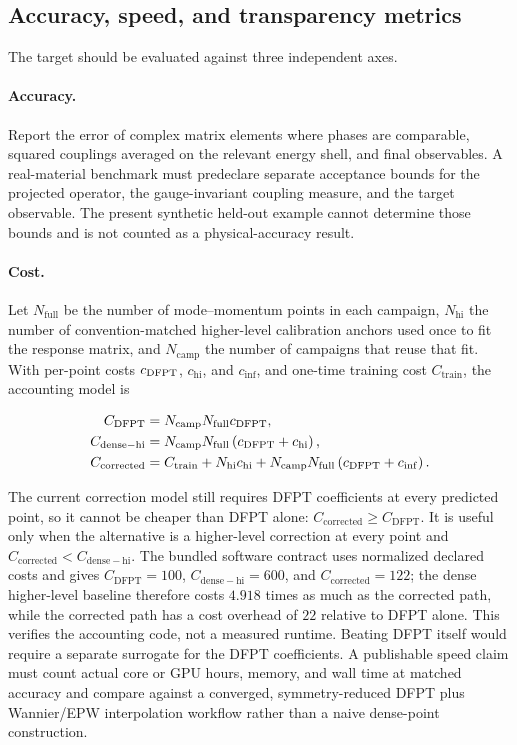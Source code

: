 \subsection{Accuracy, speed, and transparency metrics}

The target should be evaluated against three independent axes.

\paragraph{Accuracy.}
Report the error of complex matrix elements where phases are comparable, squared
couplings averaged on the relevant energy shell, and final observables.  A
real-material benchmark must predeclare separate acceptance bounds for the
projected operator, the gauge-invariant coupling measure, and the target
observable.  The present synthetic held-out example cannot determine those
bounds and is not counted as a physical-accuracy result.

\paragraph{Cost.}
Let $N_{\mathrm{full}}$ be the number of mode--momentum points in each
campaign, $N_{\mathrm{hi}}$ the number of convention-matched higher-level
calibration anchors used once to fit the response matrix, and
$N_{\mathrm{camp}}$ the number of campaigns that reuse that fit.  With
per-point costs $c_{\mathrm{DFPT}}$, $c_{\mathrm{hi}}$, and $c_{\mathrm{inf}}$, and
one-time training cost $C_{\mathrm{train}}$, the accounting model is

\begin{align}
 C_{\mathrm{DFPT}}
 &=N_{\mathrm{camp}}N_{\mathrm{full}}c_{\mathrm{DFPT}},\\
 C_{\mathrm{dense-hi}}
 &=N_{\mathrm{camp}}N_{\mathrm{full}}
   \left(c_{\mathrm{DFPT}}+c_{\mathrm{hi}}\right),\\
 C_{\mathrm{corrected}}
 &=C_{\mathrm{train}}
 +N_{\mathrm{hi}}c_{\mathrm{hi}}
 +N_{\mathrm{camp}}N_{\mathrm{full}}
   \left(c_{\mathrm{DFPT}}+c_{\mathrm{inf}}\right).
 \label{eq:costmodel}
\end{align}

The current correction model still requires DFPT coefficients at every predicted
point, so it cannot be cheaper than DFPT alone:
$C_{\mathrm{corrected}}\ge C_{\mathrm{DFPT}}$.  It is useful only when the
alternative is a higher-level correction at every point and
$C_{\mathrm{corrected}}<C_{\mathrm{dense-hi}}$.  The bundled software contract
uses normalized declared costs and gives $C_{\mathrm{DFPT}}=100$,
$C_{\mathrm{dense-hi}}=600$, and $C_{\mathrm{corrected}}=122$; the dense
higher-level baseline therefore costs $4.918$ times as much as the corrected
path, while the corrected path has a cost overhead of $22$ relative to DFPT
alone.  This verifies the accounting code, not a measured runtime.  Beating DFPT
itself would require a separate surrogate for the DFPT coefficients.  A
publishable speed claim must count actual core or GPU hours, memory, and wall
time at matched accuracy and compare against a converged, symmetry-reduced DFPT
plus Wannier/EPW interpolation workflow rather than a naive dense-point
construction.

